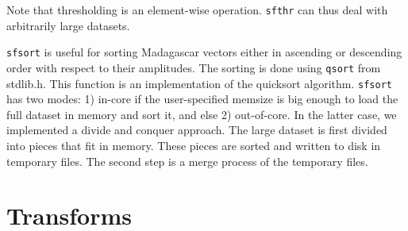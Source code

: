 
Note that thresholding is an element-wise operation. \texttt{sfthr}
can thus deal with arbitrarily large datasets.

\noindent\doublebox{\parbox{\textwidth}{

}}

\noindent
\texttt{sfsort} is useful for sorting Madagascar vectors either in
ascending or descending order with respect to their amplitudes. The
sorting is done using \texttt{qsort} from stdlib.h.  This function is
an implementation of the quicksort algorithm. \texttt{sfsort} has two
modes: 1) in-core if the user-specified memsize is big enough to load
the full dataset in memory and sort it, and else 2) out-of-core. In
the latter case, we implemented a divide and conquer approach. The
large dataset is first divided into pieces that fit in memory. These
pieces are sorted and written to disk in temporary files. The second
step is a merge process of the temporary files.


\section{Transforms}

\noindent\doublebox{\parbox{\textwidth}{

}}


